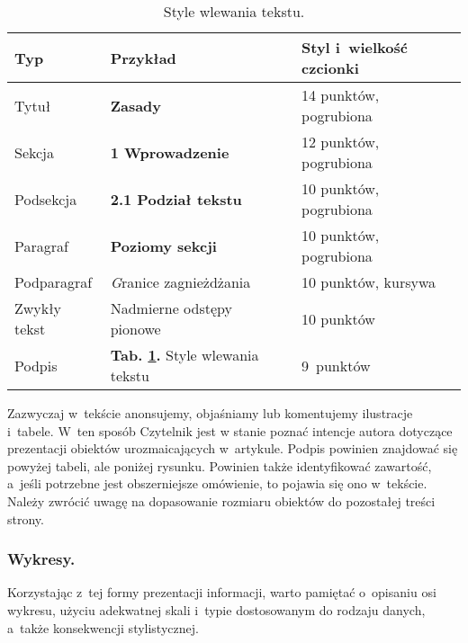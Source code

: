 \begin{table}[!h]
	\vspace{-4mm}
	\caption{
		Style wlewania tekstu.
	}
	\begin{center}
		\begin{tabular}{lll}
			\hline
			Typ & Przykład & Styl i~wielkość czcionki\\
			\hline
			Tytuł & {\Large\bfseries Zasady} & 14 punktów, pogrubiona\\
			Sekcja &  {\large\bfseries 1 Wprowadzenie} & 12 punktów, pogrubiona\\
			Podsekcja & {\bfseries 2.1 Podział tekstu} & 10 punktów, pogrubiona\\
			Paragraf & {\bfseries Poziomy sekcji} & 10 punktów, pogrubiona\\
			Podparagraf & {\textit Granice zagnieżdżania} & 10 punktów, kursywa\\
			Zwykły tekst & Nadmierne odstępy pionowe & 10 punktów\\
			Podpis & {\small\textbf{Tab. \ref{tab:styles}.} Style wlewania tekstu} & 9~punktów\\
			\hline
		\end{tabular}
	\end{center}
	\label{tab:styles}
	\vspace{-6mm}
\end{table}

\noindent Zazwyczaj w~tekście anonsujemy, objaśniamy lub komentujemy ilustracje i~tabele. W~ten sposób Czytelnik jest w stanie poznać intencje autora dotyczące prezentacji obiektów urozmaicających w~artykule. Podpis powinien znajdować się powyżej tabeli, ale poniżej rysunku. Powinien także identyfikować zawartość, a~jeśli potrzebne jest obszerniejsze omówienie, to pojawia się ono w~tekście. Należy zwrócić uwagę na dopasowanie rozmiaru obiektów do pozostałej treści strony.

\subsubsection{Wykresy.}
\label{subsubsec:charts}

Korzystając z~tej formy prezentacji informacji, warto pamiętać o~opisaniu osi wykresu, użyciu adekwatnej skali i~typie dostosowanym do rodzaju danych, a~także konsekwencji stylistycznej.

